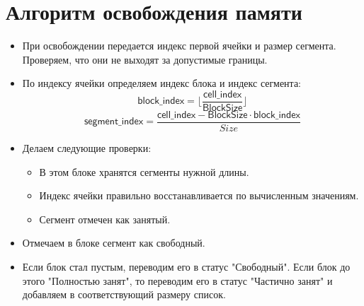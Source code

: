 \documentclass[12pt, a4paper]{article}
\begin{document}
	\section{Алгоритм освобождения памяти}

	\begin{itemize}
		\item При освобождении передается индекс первой ячейки и размер сегмента. Проверяем, что
		они не выходят за допустимые границы.
		
		\item По индексу ячейки определяем индекс блока и индекс сегмента:
		$$ \textsf{block\_index} = \lfloor \frac{\textsf{cell\_index}}{\textsf{BlockSize}} \rfloor$$
		$$ \textsf{segment\_index} = \frac
			{\textsf{cell\_index} - \textsf{BlockSize} \cdot \textsf{block\_index}}{Size} $$
		
		\item Делаем следующие проверки:
			\begin{itemize}
				 \item В этом блоке хранятся сегменты нужной длины.
				 \item Индекс ячейки правильно восстанавливается по вычисленным значениям.
				 \item Сегмент отмечен как занятый.
			\end{itemize}
		
		\item Отмечаем в блоке сегмент как свободный.
		
		\item Если блок стал пустым, переводим его в статус "Свободный". Если блок до этого "Полностью
		занят", то переводим его в статус "Частично занят" и добавляем в соответствующий размеру список.

	\end{itemize}
\end{document}
